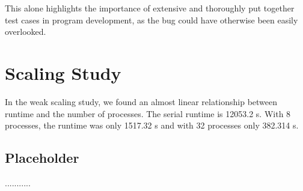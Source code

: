 \documentclass[11pt]{article}
\begin{document}
This alone highlights the importance of extensive and thoroughly put together test cases in program development, as the bug could have otherwise been easily overlooked.

\section{Scaling Study}
In the weak scaling study, we found an almost linear relationship between runtime and the number of processes. The serial runtime is 12053.2 s. With 8 processes, the runtime was only 1517.32 s and with 32 processes only 382.314 s.

\subsection{Placeholder}
...........
\end{document}
